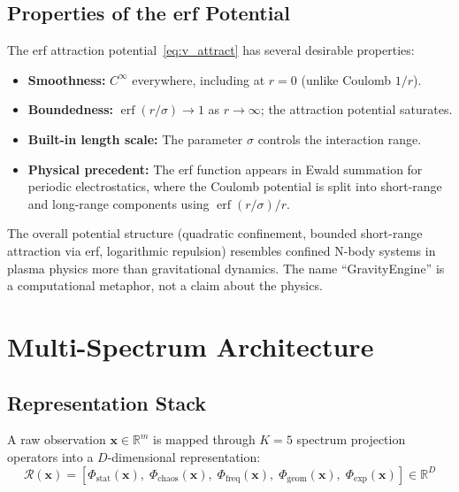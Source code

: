 \documentclass{article}
\newcommand{\R}{\mathbb{R}}
\newcommand{\calR}{\mathcal{R}}
\DeclareMathOperator{\erf}{erf}
\begin{document}
\subsection{Properties of the erf Potential}

The erf attraction potential~\eqref{eq:v_attract} has several desirable properties:
\begin{itemize}[leftmargin=*]
    \item \textbf{Smoothness:} $C^\infty$ everywhere, including at $r=0$ (unlike Coulomb $1/r$).
    \item \textbf{Boundedness:} $\erf(r/\sigma) \to 1$ as $r \to \infty$; the attraction potential saturates.
    \item \textbf{Built-in length scale:} The parameter $\sigma$ controls the interaction range.
    \item \textbf{Physical precedent:} The erf function appears in Ewald summation for periodic electrostatics, where the Coulomb potential is split into short-range and long-range components using $\erf(r/\sigma)/r$.
\end{itemize}

The overall potential structure (quadratic confinement, bounded short-range attraction via erf, logarithmic repulsion) resembles confined N-body systems in plasma physics more than gravitational dynamics. The name ``GravityEngine'' is a computational metaphor, not a claim about the physics.

\section{Multi-Spectrum Architecture}
\label{sec:framework}

\subsection{Representation Stack}

A raw observation $\mathbf{x} \in \R^m$ is mapped through $K=5$ spectrum projection operators into a $D$-dimensional representation:
\begin{equation}
\calR(\mathbf{x}) = \left[\Phi_{\text{stat}}(\mathbf{x}),\; \Phi_{\text{chaos}}(\mathbf{x}),\; \Phi_{\text{freq}}(\mathbf{x}),\; \Phi_{\text{geom}}(\mathbf{x}),\; \Phi_{\text{exp}}(\mathbf{x})\right] \in \R^D
\label{eq:stack}
\end{equation}
\end{document}
